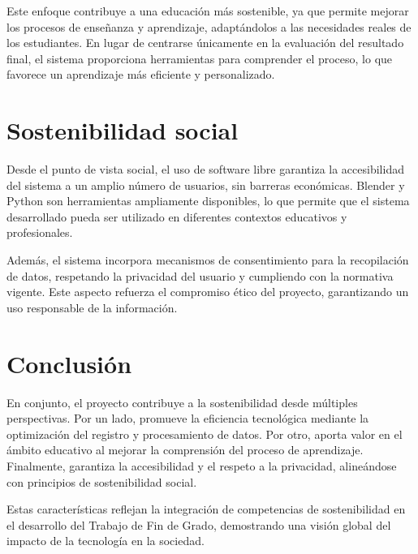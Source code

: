Este enfoque contribuye a una educación más sostenible, ya que permite mejorar los procesos de enseñanza y aprendizaje, adaptándolos a las necesidades reales de los estudiantes. En lugar de centrarse únicamente en la evaluación del resultado final, el sistema proporciona herramientas para comprender el proceso, lo que favorece un aprendizaje más eficiente y personalizado.

\section{Sostenibilidad social}

Desde el punto de vista social, el uso de software libre garantiza la accesibilidad del sistema a un amplio número de usuarios, sin barreras económicas. Blender y Python son herramientas ampliamente disponibles, lo que permite que el sistema desarrollado pueda ser utilizado en diferentes contextos educativos y profesionales.

Además, el sistema incorpora mecanismos de consentimiento para la recopilación de datos, respetando la privacidad del usuario y cumpliendo con la normativa vigente. Este aspecto refuerza el compromiso ético del proyecto, garantizando un uso responsable de la información.

\section{Conclusión}

En conjunto, el proyecto contribuye a la sostenibilidad desde múltiples perspectivas. Por un lado, promueve la eficiencia tecnológica mediante la optimización del registro y procesamiento de datos. Por otro, aporta valor en el ámbito educativo al mejorar la comprensión del proceso de aprendizaje. Finalmente, garantiza la accesibilidad y el respeto a la privacidad, alineándose con principios de sostenibilidad social.

Estas características reflejan la integración de competencias de sostenibilidad en el desarrollo del Trabajo de Fin de Grado, demostrando una visión global del impacto de la tecnología en la sociedad.